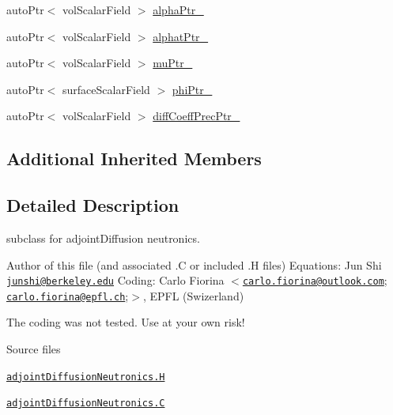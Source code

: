 \begin{DoxyCompactItemize}
\item 
auto\+Ptr$<$ vol\+Scalar\+Field $>$ \hyperlink{classFoam_1_1adjointDiffusionNeutronics_abc7c5bd59d290d277926652df30d5325}{alpha\+Ptr\+\_\+}
\item 
auto\+Ptr$<$ vol\+Scalar\+Field $>$ \hyperlink{classFoam_1_1adjointDiffusionNeutronics_ab6fbf6c23c7b0560bebc841cd9a548cf}{alphat\+Ptr\+\_\+}
\item 
auto\+Ptr$<$ vol\+Scalar\+Field $>$ \hyperlink{classFoam_1_1adjointDiffusionNeutronics_a02a6957e64f8ee5582ee4bcd4104b608}{mu\+Ptr\+\_\+}
\item 
auto\+Ptr$<$ surface\+Scalar\+Field $>$ \hyperlink{classFoam_1_1adjointDiffusionNeutronics_a497673767745b44b26977e35496c55df}{phi\+Ptr\+\_\+}
\item 
auto\+Ptr$<$ vol\+Scalar\+Field $>$ \hyperlink{classFoam_1_1adjointDiffusionNeutronics_aa68fdcce7eec7392d06d8be2a783ac8c}{diff\+Coeff\+Prec\+Ptr\+\_\+}
\end{DoxyCompactItemize}
\subsection*{Additional Inherited Members}


\subsection{Detailed Description}
subclass for adjoint\+Diffusion neutronics. 

\label{_Description}%
 Author of this file (and associated .C or included .H files) Equations\+: Jun Shi \href{mailto:junshi@berkeley.edu}{\tt junshi@berkeley.\+edu} Coding\+: Carlo Fiorina $<$\href{mailto:carlo.fiorina@outlook.com}{\tt carlo.\+fiorina@outlook.\+com}; \href{mailto:carlo.fiorina@epfl.ch}{\tt carlo.\+fiorina@epfl.\+ch};$>$, E\+P\+FL (Swizerland)

The coding was not tested. Use at your own risk!

\begin{DoxyParagraph}{Source files}

\begin{DoxyItemize}
\item \href{../../../home/carlo/data/GeN-Foam/GeN-Foam_ffn/GeN-Foam/GeN-Foam/classes/neutronics/adjointDiffusion/adjointDiffusionNeutronics.H}{\tt adjoint\+Diffusion\+Neutronics.\+H} 
\item \href{../../../home/carlo/data/GeN-Foam/GeN-Foam_ffn/GeN-Foam/GeN-Foam/classes/neutronics/adjointDiffusion/adjointDiffusionNeutronics.C}{\tt adjoint\+Diffusion\+Neutronics.\+C} 
\end{DoxyItemize}
\end{DoxyParagraph}


